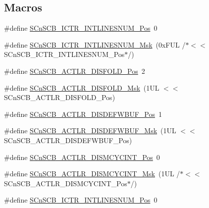 \subsection*{Macros}
\begin{DoxyCompactItemize}
\item 
\#define \hyperlink{group___c_m_s_i_s___s_cn_s_c_b_ga0777ddf379af50f9ca41d40573bfffc5}{S\+Cn\+S\+C\+B\+\_\+\+I\+C\+T\+R\+\_\+\+I\+N\+T\+L\+I\+N\+E\+S\+N\+U\+M\+\_\+\+Pos}~0
\item 
\#define \hyperlink{group___c_m_s_i_s___s_cn_s_c_b_ga3efa0f5210051464e1034b19fc7b33c7}{S\+Cn\+S\+C\+B\+\_\+\+I\+C\+T\+R\+\_\+\+I\+N\+T\+L\+I\+N\+E\+S\+N\+U\+M\+\_\+\+Msk}~(0x\+F\+U\+L /$\ast$$<$$<$ S\+Cn\+S\+C\+B\+\_\+\+I\+C\+T\+R\+\_\+\+I\+N\+T\+L\+I\+N\+E\+S\+N\+U\+M\+\_\+\+Pos$\ast$/)
\item 
\#define \hyperlink{group___c_m_s_i_s___s_cn_s_c_b_gaab395870643a0bee78906bb15ca5bd02}{S\+Cn\+S\+C\+B\+\_\+\+A\+C\+T\+L\+R\+\_\+\+D\+I\+S\+F\+O\+L\+D\+\_\+\+Pos}~2
\item 
\#define \hyperlink{group___c_m_s_i_s___s_cn_s_c_b_gaa9dd2d4a2350499188f438d0aa9fd982}{S\+Cn\+S\+C\+B\+\_\+\+A\+C\+T\+L\+R\+\_\+\+D\+I\+S\+F\+O\+L\+D\+\_\+\+Msk}~(1\+U\+L $<$$<$ S\+Cn\+S\+C\+B\+\_\+\+A\+C\+T\+L\+R\+\_\+\+D\+I\+S\+F\+O\+L\+D\+\_\+\+Pos)
\item 
\#define \hyperlink{group___c_m_s_i_s___s_cn_s_c_b_gafa2eb37493c0f8dae77cde81ecf80f77}{S\+Cn\+S\+C\+B\+\_\+\+A\+C\+T\+L\+R\+\_\+\+D\+I\+S\+D\+E\+F\+W\+B\+U\+F\+\_\+\+Pos}~1
\item 
\#define \hyperlink{group___c_m_s_i_s___s_cn_s_c_b_ga6cda7b7219232a008ec52cc8e89d5d08}{S\+Cn\+S\+C\+B\+\_\+\+A\+C\+T\+L\+R\+\_\+\+D\+I\+S\+D\+E\+F\+W\+B\+U\+F\+\_\+\+Msk}~(1\+U\+L $<$$<$ S\+Cn\+S\+C\+B\+\_\+\+A\+C\+T\+L\+R\+\_\+\+D\+I\+S\+D\+E\+F\+W\+B\+U\+F\+\_\+\+Pos)
\item 
\#define \hyperlink{group___c_m_s_i_s___s_cn_s_c_b_gaaa3e79f5ead4a32c0ea742b2a9ffc0cd}{S\+Cn\+S\+C\+B\+\_\+\+A\+C\+T\+L\+R\+\_\+\+D\+I\+S\+M\+C\+Y\+C\+I\+N\+T\+\_\+\+Pos}~0
\item 
\#define \hyperlink{group___c_m_s_i_s___s_cn_s_c_b_ga2a2818f0489ad10b6ea2964e899d4cbc}{S\+Cn\+S\+C\+B\+\_\+\+A\+C\+T\+L\+R\+\_\+\+D\+I\+S\+M\+C\+Y\+C\+I\+N\+T\+\_\+\+Msk}~(1\+U\+L /$\ast$$<$$<$ S\+Cn\+S\+C\+B\+\_\+\+A\+C\+T\+L\+R\+\_\+\+D\+I\+S\+M\+C\+Y\+C\+I\+N\+T\+\_\+\+Pos$\ast$/)
\item 
\#define \hyperlink{group___c_m_s_i_s___s_cn_s_c_b_ga0777ddf379af50f9ca41d40573bfffc5}{S\+Cn\+S\+C\+B\+\_\+\+I\+C\+T\+R\+\_\+\+I\+N\+T\+L\+I\+N\+E\+S\+N\+U\+M\+\_\+\+Pos}~0

\end{DoxyCompactItemize}
